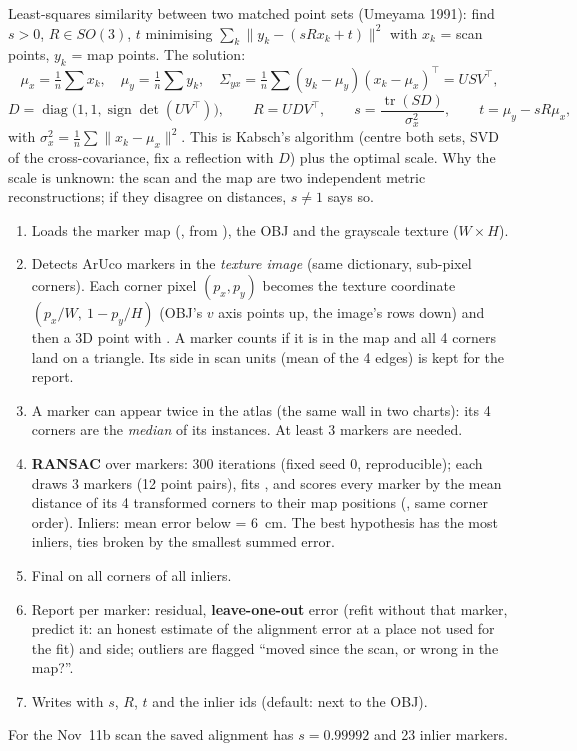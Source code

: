 Least-squares similarity between two matched point sets (Umeyama 1991): find $s > 0$, $R \in SO(3)$, $t$
minimising $\sum_k \lVert y_k - (s R x_k + t)\rVert^2$ with $x_k$ = scan points, $y_k$ = map points. The solution:
\[
\mu_x = \tfrac1n\textstyle\sum x_k,\quad \mu_y = \tfrac1n\sum y_k,\quad
\Sigma_{yx} = \tfrac1n \sum (y_k - \mu_y)(x_k - \mu_x)^\top = U S V^\top,
\]
\[
D = \operatorname{diag}\big(1, 1, \operatorname{sign}\det(UV^\top)\big),\qquad
R = U D V^\top,\qquad
s = \frac{\operatorname{tr}(S D)}{\sigma_x^2},\qquad
t = \mu_y - s R \mu_x,
\]
with $\sigma_x^2 = \tfrac1n\sum\lVert x_k - \mu_x\rVert^2$. This is Kabsch's algorithm (centre both sets, SVD of
the cross-covariance, fix a reflection with $D$) plus the optimal scale. Why the scale is unknown: the scan and the
map are two independent metric reconstructions; if they disagree on distances, $s \neq 1$ says so.

\begin{enumerate}[nosep]
\item Loads the marker map (, from ), the OBJ and the
  grayscale texture ($W \times H$).
\item Detects ArUco markers in the \emph{texture image} (same dictionary, sub-pixel corners). Each corner pixel
  $(p_x, p_y)$ becomes the texture coordinate $(p_x/W,\ 1 - p_y/H)$ (OBJ's $v$ axis points up, the image's
  rows down) and then a 3D point with . A marker counts if it is in the map and all 4 corners
  land on a triangle. Its side in scan units (mean of the 4 edges) is kept for the report.
\item A marker can appear twice in the atlas (the same wall in two charts): its 4 corners are the
  \emph{median} of its instances. At least 3 markers are needed.
\item \textbf{RANSAC} over markers: 300 iterations (fixed seed 0, reproducible); each draws 3 markers (12 point
  pairs), fits , and scores every marker by the mean distance of its 4 transformed corners to
  their map positions (, same corner order). Inliers: mean error below  =
  6~cm. The best hypothesis has the most inliers, ties broken by the smallest summed error.
\item Final  on all corners of all inliers.
\item Report per marker: residual, \textbf{leave-one-out} error (refit without that marker, predict it: an honest
  estimate of the alignment error at a place not used for the fit) and side; outliers are flagged ``moved since
  the scan, or wrong in the map?''.
\item Writes  with $s$, $R$, $t$ and the inlier ids (default: next to the OBJ).
\end{enumerate}
For the Nov~11b scan the saved alignment has $s = 0.99992$ and 23 inlier markers.

